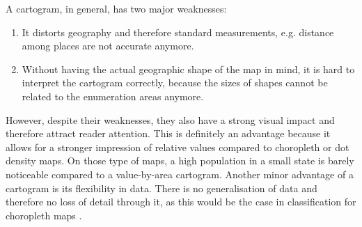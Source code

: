 \newpage
A cartogram, in general, has two major weaknesses:
\begin{enumerate}
\item It distorts geography and therefore standard measurements, e.g. distance among places are not accurate anymore.
\item Without having the actual geographic shape of the map in mind, it is hard to interpret the cartogram correctly, because the sizes of shapes cannot be related to the enumeration areas anymore.
\end{enumerate}

However, despite their weaknesses, they also have a strong visual impact and therefore attract reader attention. This is definitely an advantage because it allows for a stronger impression of relative values compared to choropleth or dot density maps. On those type of maps, a high population in a small state is barely noticeable compared to a value-by-area cartogram.
Another minor advantage of a cartogram is its flexibility in data. There is no generalisation of data and therefore no loss of detail through it, as this would be the case in classification for choropleth maps .
